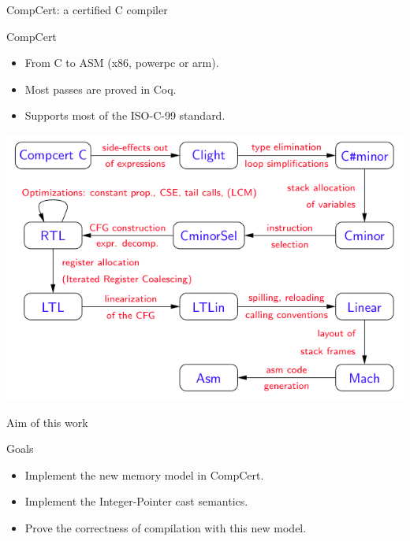 \begin{frame}{CompCert: a certified C compiler}

  \begin{block}{CompCert}
    \begin{itemize}
      \item From C to ASM (x86, powerpc or arm).
      \item Most passes are proved in Coq.
      \item Supports most of the ISO-C-99 standard.
    \end{itemize}
  \end{block}
  \vfill
  \begin{center}
    \includegraphics[scale=0.6]{img/passes.png}
  \end{center}
  
\end{frame}


\begin{frame}{Aim of this work}
  
  \begin{block}{Goals}
    \begin{itemize}
    \item Implement the new memory model in CompCert.
    \item Implement the Integer-Pointer cast semantics.
    \item Prove the correctness of compilation with this new model.
    \end{itemize}
  \end{block}
  
\end{frame}
